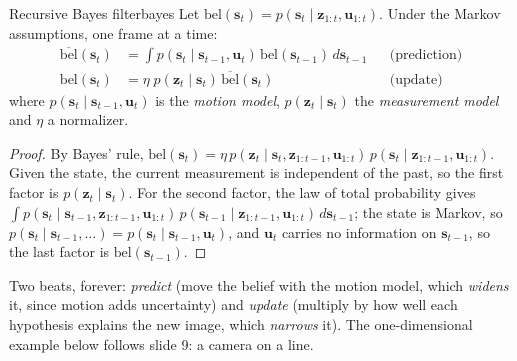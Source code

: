 \documentclass[11pt,a4paper]{article}
\newcommand{\bz}{\mathbf{z}}
\newcommand{\bu}{\mathbf{u}}
\newcommand{\bs}{\mathbf{s}}
\begin{document}
\begin{theorem}{Recursive Bayes filter}{bayes}
Let $\mathrm{bel}(\bs_t)=p(\bs_t\mid\bz_{1:t},\bu_{1:t})$. Under the Markov assumptions, one frame at a time:
\begin{align*}
\overline{\mathrm{bel}}(\bs_t)&=\int p(\bs_t\mid\bs_{t-1},\bu_t)\,\mathrm{bel}(\bs_{t-1})\,d\bs_{t-1} &&\text{(prediction)}\\
\mathrm{bel}(\bs_t)&=\eta\; p(\bz_t\mid\bs_t)\,\overline{\mathrm{bel}}(\bs_t)&&\text{(update)}
\end{align*}
where $p(\bs_t\mid\bs_{t-1},\bu_t)$ is the \emph{motion model}, $p(\bz_t\mid\bs_t)$ the \emph{measurement model} and $\eta$ a normalizer.
\end{theorem}
\begin{proof}
By Bayes' rule, $\mathrm{bel}(\bs_t)=\eta\,p(\bz_t\mid\bs_t,\bz_{1:t-1},\bu_{1:t})\,p(\bs_t\mid\bz_{1:t-1},\bu_{1:t})$. Given the state, the current measurement is independent of the past, so the first factor is $p(\bz_t\mid\bs_t)$. For the second factor, the law of total probability gives $\int p(\bs_t\mid\bs_{t-1},\bz_{1:t-1},\bu_{1:t})\,p(\bs_{t-1}\mid\bz_{1:t-1},\bu_{1:t})\,d\bs_{t-1}$; the state is Markov, so $p(\bs_t\mid\bs_{t-1},\dots)=p(\bs_t\mid\bs_{t-1},\bu_t)$, and $\bu_t$ carries no information on $\bs_{t-1}$, so the last factor is $\mathrm{bel}(\bs_{t-1})$. \qedhere
\end{proof}
\begin{intuition}
Two beats, forever: \emph{predict} (move the belief with the motion model, which \emph{widens} it, since motion adds uncertainty) and \emph{update} (multiply by how well each hypothesis explains the new image, which \emph{narrows} it). The one-dimensional example below follows slide 9: a camera on a line.
\end{intuition}
\end{document}

